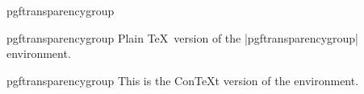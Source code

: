 \begin{environment}{{pgftransparencygroup}}
\begin{plainenvironment}{{pgftransparencygroup}}
  Plain \TeX\ version of the |{pgftransparencygroup}| environment.
\end{plainenvironment}

\begin{contextenvironment}{{pgftransparencygroup}}
  This is the Con\TeX t version of the environment.
\end{contextenvironment}

\end{environment}



